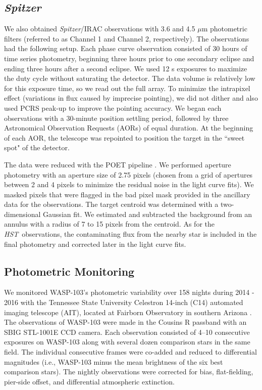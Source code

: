 \documentclass[twocolumn]{aastex61}
\newcommand{\project}[1]{\textsl{#1}}
\newcommand{\HST}{\project{HST}}
\newcommand{\Spitzer}{\project{Spitzer}}
\begin{document}
\subsection{\Spitzer}
We also obtained \Spitzer/IRAC observations with 3.6 and 4.5 $\mu$m photometric filters (referred to as Channel 1 and Channel 2, respectively). The observations had the following setup. Each phase curve observation consisted of 30 hours of time series photometry, beginning three hours prior to one secondary eclipse and ending three hours after a second eclipse.  We used 12 s exposures to maximize the duty cycle without saturating the detector. The data volume is relatively low for this exposure time, so we read out the full array. To minimize the intrapixel effect (variations in flux caused by imprecise pointing), we did not dither and also used PCRS peak-up to improve the pointing accuracy. We began each observations with a 30-minute position settling period, followed by three Astronomical Observation Requests (AORs) of equal duration. At the beginning of each AOR, the telescope was repointed to position the target in the ``sweet spot" of the detector.

The data were reduced with the POET pipeline \citep{stevenson12}. We performed aperture photometry with an aperture size of 2.75 pixels (chosen from a grid of apertures between 2 and 4 pixels to minimize the residual noise in the light curve fits). We masked pixels that were flagged in the bad pixel mask provided in the ancillary data for the observations. The target centroid was determined with a two-dimensional Gaussian fit.  We estimated and subtracted the background from an annulus with a radius of 7 to 15 pixels from the centroid. As for the \HST\ observations, the contaminating flux from the nearby star is included in the final photometry and corrected later in the light curve fits.


\subsection{Photometric Monitoring}
We monitored WASP-103's photometric variability over 158 nights during 2014 - 2016 with the Tennessee State University Celestron 14-inch (C14) automated imaging telescope (AIT), located at Fairborn Observatory in southern Arizona \citep[][]{henry99}.  The observations of WASP-103 were made in the Cousins R passband with an SBIG STL-1001E CCD camera.  Each observation consisted of 4--10 consecutive exposures on WASP-103 along with several dozen comparison stars in the same field. The individual consecutive frames were co-added and reduced to differential magnitudes (i.e., WASP-103 minus the mean brightness of the six best comparison stars). The nightly observations were corrected for bias, flat-fielding, pier-side offset, and differential atmospheric extinction.  
\end{document}
